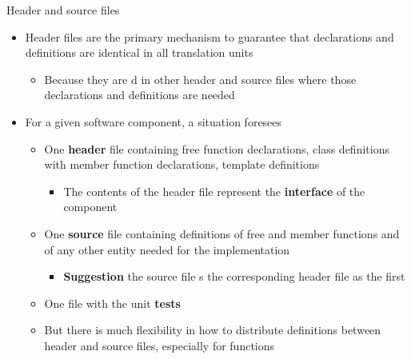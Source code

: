 \begin{frame}{Header and source files}

  \begin{itemize}[<+->]
  \item Header files are the primary mechanism to guarantee that declarations
    and definitions are identical in all translation units
    \begin{itemize}[<.->]
    \item Because they are d in other header and source files
      where those declarations and definitions are needed
    \end{itemize}
  \item For a given software component, a  situation foresees
    \begin{itemize}
    \item One \textbf{header} file containing free function declarations, class
      definitions with member function declarations, template definitions
      \begin{itemize}
      \item The contents of the header file represent the
        \textbf{interface} of the component
      \end{itemize}
    \item One \textbf{source} file containing definitions of free and member functions
      and of any other entity needed for the implementation
      \begin{itemize}
      \item \textbf{Suggestion} the source file s the
        corresponding header file as the first 
      \end{itemize}
    \item One file with the unit \textbf{tests}
    \item But there is much flexibility in how to distribute
      definitions between header and source files, especially for
      functions
    \end{itemize}
  \end{itemize}
\end{frame}

